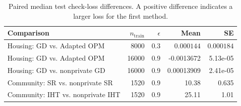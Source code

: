 \begin{table}[!htb]
\centering\small\journaltablestyle
\caption{Paired median test check-loss differences. A positive difference indicates a larger loss for the first method.}
\label{tab:real-data-paired}
\begin{tabular}{@{}lrrrr@{}}
\toprule
Comparison & $n_{\mathrm{train}}$ & $\epsilon$ & Mean & SE\\
\midrule
Housing: GD vs. Adapted OPM & 8000 & 0.3 & $0.000144$ & $0.000184$\\
Housing: GD vs. Adapted OPM & 16000 & 0.9 & -0.0013672 & 5.13e-05\\
Housing: GD vs. nonprivate GD & 16000 & 0.9 & 0.00013909 & 2.41e-05\\
Community: SR vs. nonprivate SR & 1520 & 0.9 & 10.38 & 0.635\\
Community: IHT vs. nonprivate IHT & 1520 & 0.9 & 25.11 & 1.01\\
\bottomrule
\end{tabular}
\end{table}

